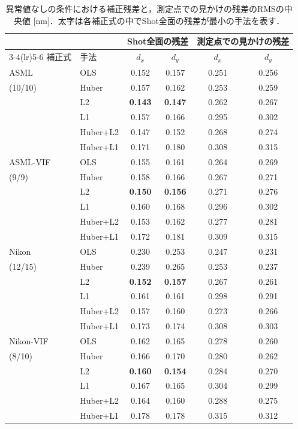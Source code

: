\documentclass[11pt,a4paper]{ltjsarticle}
\begin{document}
\begin{table}[tb]
  \centering
  \caption{異常値なしの条件における補正残差と，測定点での見かけの残差のRMSの中央値 [nm]．太字は各補正式の中でShot全面の残差が最小の手法を表す．}
  \label{tab:clean}
  \small
  \begin{tabular}{llcccc}
    \toprule
     & & \multicolumn{2}{c}{Shot全面の残差} & \multicolumn{2}{c}{測定点での見かけの残差} \\
    \cmidrule(lr){3-4}\cmidrule(lr){5-6}
    補正式 & 手法 & $d_x$ & $d_y$ & $d_x$ & $d_y$ \\
    \midrule
    ASML & OLS & 0.152 & 0.157 & 0.251 & 0.256 \\
    (10/10) & Huber & 0.157 & 0.162 & 0.253 & 0.259 \\
     & L2 & \textbf{0.143} & \textbf{0.147} & 0.262 & 0.267 \\
     & L1 & 0.157 & 0.166 & 0.295 & 0.302 \\
     & Huber+L2 & 0.147 & 0.152 & 0.268 & 0.274 \\
     & Huber+L1 & 0.171 & 0.180 & 0.308 & 0.315 \\
    \midrule
    ASML-VIF & OLS & 0.155 & 0.161 & 0.264 & 0.269 \\
    (9/9) & Huber & 0.158 & 0.166 & 0.267 & 0.271 \\
     & L2 & \textbf{0.150} & \textbf{0.156} & 0.271 & 0.276 \\
     & L1 & 0.160 & 0.168 & 0.296 & 0.302 \\
     & Huber+L2 & 0.153 & 0.162 & 0.277 & 0.281 \\
     & Huber+L1 & 0.172 & 0.181 & 0.309 & 0.315 \\
    \midrule
    Nikon & OLS & 0.230 & 0.253 & 0.247 & 0.231 \\
    (12/15) & Huber & 0.239 & 0.265 & 0.253 & 0.237 \\
     & L2 & \textbf{0.152} & \textbf{0.157} & 0.267 & 0.261 \\
     & L1 & 0.161 & 0.161 & 0.298 & 0.291 \\
     & Huber+L2 & 0.157 & 0.160 & 0.273 & 0.266 \\
     & Huber+L1 & 0.173 & 0.174 & 0.308 & 0.303 \\
    \midrule
    Nikon-VIF & OLS & 0.162 & 0.165 & 0.278 & 0.260 \\
    (8/10) & Huber & 0.166 & 0.170 & 0.280 & 0.262 \\
     & L2 & \textbf{0.160} & \textbf{0.154} & 0.284 & 0.270 \\
     & L1 & 0.167 & 0.165 & 0.304 & 0.299 \\
     & Huber+L2 & 0.164 & 0.160 & 0.288 & 0.275 \\
     & Huber+L1 & 0.178 & 0.178 & 0.315 & 0.312 \\
    \bottomrule
  \end{tabular}
\end{table}
\end{document}

